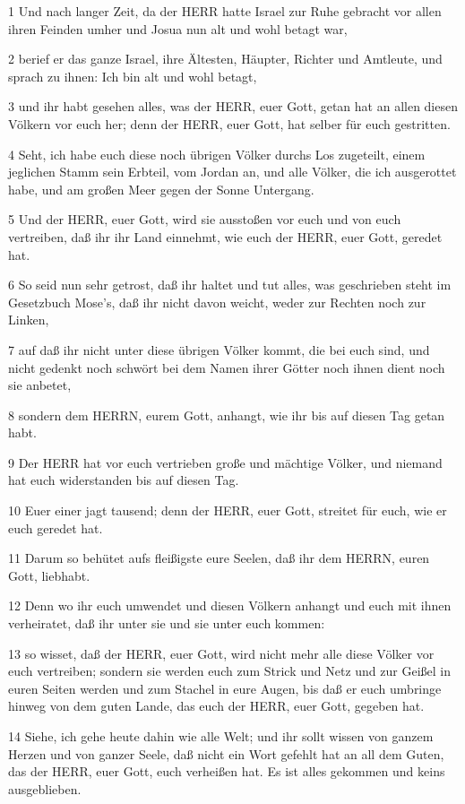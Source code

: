 \par 1 Und nach langer Zeit, da der HERR hatte Israel zur Ruhe gebracht vor allen ihren Feinden umher und Josua nun alt und wohl betagt war,
\par 2 berief er das ganze Israel, ihre Ältesten, Häupter, Richter und Amtleute, und sprach zu ihnen: Ich bin alt und wohl betagt,
\par 3 und ihr habt gesehen alles, was der HERR, euer Gott, getan hat an allen diesen Völkern vor euch her; denn der HERR, euer Gott, hat selber für euch gestritten.
\par 4 Seht, ich habe euch diese noch übrigen Völker durchs Los zugeteilt, einem jeglichen Stamm sein Erbteil, vom Jordan an, und alle Völker, die ich ausgerottet habe, und am großen Meer gegen der Sonne Untergang.
\par 5 Und der HERR, euer Gott, wird sie ausstoßen vor euch und von euch vertreiben, daß ihr ihr Land einnehmt, wie euch der HERR, euer Gott, geredet hat.
\par 6 So seid nun sehr getrost, daß ihr haltet und tut alles, was geschrieben steht im Gesetzbuch Mose's, daß ihr nicht davon weicht, weder zur Rechten noch zur Linken,
\par 7 auf daß ihr nicht unter diese übrigen Völker kommt, die bei euch sind, und nicht gedenkt noch schwört bei dem Namen ihrer Götter noch ihnen dient noch sie anbetet,
\par 8 sondern dem HERRN, eurem Gott, anhangt, wie ihr bis auf diesen Tag getan habt.
\par 9 Der HERR hat vor euch vertrieben große und mächtige Völker, und niemand hat euch widerstanden bis auf diesen Tag.
\par 10 Euer einer jagt tausend; denn der HERR, euer Gott, streitet für euch, wie er euch geredet hat.
\par 11 Darum so behütet aufs fleißigste eure Seelen, daß ihr dem HERRN, euren Gott, liebhabt.
\par 12 Denn wo ihr euch umwendet und diesen Völkern anhangt und euch mit ihnen verheiratet, daß ihr unter sie und sie unter euch kommen:
\par 13 so wisset, daß der HERR, euer Gott, wird nicht mehr alle diese Völker vor euch vertreiben; sondern sie werden euch zum Strick und Netz und zur Geißel in euren Seiten werden und zum Stachel in eure Augen, bis daß er euch umbringe hinweg von dem guten Lande, das euch der HERR, euer Gott, gegeben hat.
\par 14 Siehe, ich gehe heute dahin wie alle Welt; und ihr sollt wissen von ganzem Herzen und von ganzer Seele, daß nicht ein Wort gefehlt hat an all dem Guten, das der HERR, euer Gott, euch verheißen hat. Es ist alles gekommen und keins ausgeblieben.
